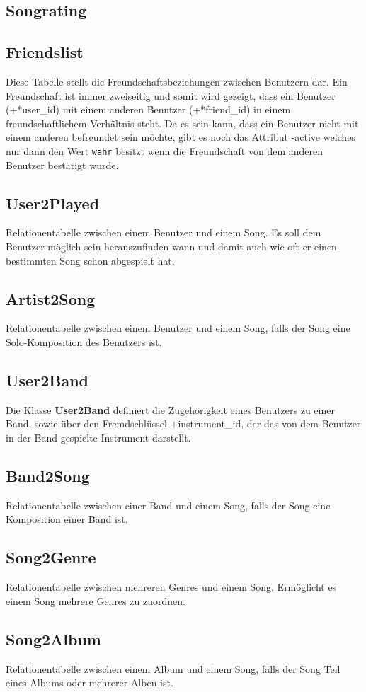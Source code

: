 \documentclass[11pt,a4paper,DIV=9]{scrartcl}
\begin{document}
  \subsection{Songrating}
  \subsection{Friendslist}
    Diese Tabelle stellt die Freundschaftsbeziehungen zwischen Benutzern dar. Ein Freundschaft ist immer zweiseitig und somit wird gezeigt, dass ein Benutzer (+*user\_id) mit einem anderen Benutzer (+*friend\_id) in einem freundschaftlichem Verhältnis steht. Da es sein kann, dass ein Benutzer nicht mit einem anderen befreundet sein möchte, gibt es noch das Attribut -active welches nur dann den Wert \texttt{wahr} besitzt wenn die Freundschaft von dem anderen Benutzer bestätigt wurde.
  \subsection{User2Played}
    Relationentabelle zwischen einem Benutzer und einem Song. Es soll dem Benutzer möglich sein herauszufinden wann und damit auch wie oft er einen bestimmten Song schon abgespielt hat.
  \subsection{Artist2Song}
    Relationentabelle zwischen einem Benutzer und einem Song, falls der Song eine Solo-Komposition des Benutzers ist.
  \subsection{User2Band}
    Die Klasse \textbf{User2Band} definiert die Zugehörigkeit eines Benutzers zu einer Band, sowie über den Fremdschlüssel +instrument\_id, der das von dem Benutzer in der Band gespielte Instrument darstellt.
  \subsection{Band2Song}
    Relationentabelle zwischen einer Band und einem Song, falls der Song eine Komposition einer Band ist.
  \subsection{Song2Genre}
    Relationentabelle zwischen mehreren Genres und einem Song. Ermöglicht es einem Song mehrere Genres zu zuordnen.
  \subsection{Song2Album}
    Relationentabelle zwischen einem Album und einem Song, falls der Song Teil eines Albums oder mehrerer Alben ist.
\end{document}
